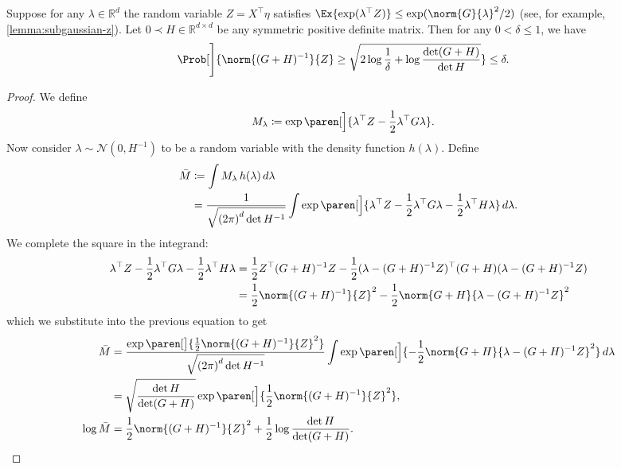 \documentclass{article}
\newcommand{\defeq}{\coloneq}
\newcommand{\inv}[1]{#1^{-1}}
\newcommand{\Real}{\mathds{R}}
\DeclarePairedDelimiter{\paren}()
\newcommand{\transp}[1]{#1^\top}
\begin{document}
\begin{lemma}\label{lemma:z-norm-bounded-whp}
  Suppose for any $\lambda\in\Real^d$ the random variable
  $Z=\transp{X}\eta$ satisfies
  $\Ex{\exp(\transp{\lambda}Z)} \le \exp(\norm{G}{\lambda}^2/2)$ (see,
  for example, \cref{lemma:subgaussian-z}).  Let
  $0 \prec H \in \Real^{d\times d}$ be any symmetric positive definite
  matrix.  Then for any $0 < \delta \le 1$, we have
  \begin{align*}
    \Prob[\Bigg]{\norm{\inv{(G+H)}}{Z} \ge \sqrt{2\log\frac{1}{\delta} + \log\frac{\det(G+H)}{\det H}}} &\le \delta.
  \end{align*}

  \begin{proof}
    We define
    \begin{align*}
      M_\lambda &\defeq \exp\paren[\Big]{\transp{\lambda}Z - \frac{1}{2}\transp{\lambda}G\lambda}.
    \end{align*}
    Now consider $\lambda\sim\mathcal{N}(0, \inv{H})$ to be a random
    variable with the density function $h(\lambda)$.  Define
    \begin{align*}
      \bar{M}
      &\defeq \int M_\lambda \,h(\lambda)\,d\lambda \\
      &= \frac{1}{\sqrt{{(2\pi)}^d \det\inv{H}}} \int\exp\paren[\Big]{\transp{\lambda}Z
        - \frac{1}{2}\transp{\lambda}G\lambda
        - \frac{1}{2}\transp{\lambda}H\lambda
        } \,d\lambda.
    \end{align*}
    We complete the square in the integrand:
    \begin{align*}
      \transp{\lambda}Z - \frac{1}{2}\transp{\lambda}G\lambda - \frac{1}{2}\transp{\lambda}H\lambda
      &= \frac{1}{2}\transp{Z}\inv{(G+H)}Z - \frac{1}{2}\transp{(\lambda - \inv{(G+H)}Z)}(G+H)(\lambda-\inv{(G+H)}Z) \\
      &= \frac{1}{2} \norm{\inv{(G+H)}}{Z}^2 - \frac{1}{2}\norm{G+H}{\lambda-\inv{(G+H)}Z}^2
    \end{align*}
    which we substitute into the previous equation to get
    \begin{align*}
      \bar{M}
      &= \frac{\exp\paren[\big]{\frac{1}{2} \norm{\inv{(G+H)}}{Z}^2}}{\sqrt{{(2\pi)}^d \det\inv{H}}}
        \int \exp\paren[\Big]{-\frac{1}{2} \norm{G+H}{\lambda-\inv{(G+H)}Z}^2} \,d\lambda \\
      &= \sqrt{\frac{\det H}{\det(G+H)}} \exp\paren[\Big]{\frac{1}{2}\norm{\inv{(G+H)}}{Z}^2}, \\
      \log\bar{M} &= \frac{1}{2}\norm{\inv{(G+H)}}{Z}^2 + \frac{1}{2}\log\frac{\det H}{\det(G+H)}.

\end{align*}
\end{proof}
\end{lemma}
\end{document}

